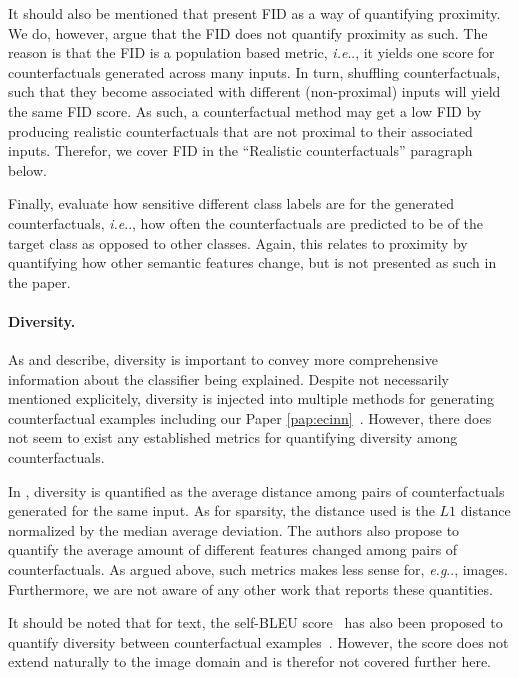 \documentclass[11pt,a4paper,twoside,openright,final]{memoir}
\makeatletter
\DeclareRobustCommand\onedot{\futurelet\@let@token\@onedot}
\def\@onedot{\ifx\@let@token.\else.\null\fi\xspace}
\def\eg{\emph{e.g}\onedot} \def\Eg{\emph{E.g}\onedot}
\def\ie{\emph{i.e}\onedot} \def\Ie{\emph{I.e}\onedot}
\newcommand*{\paperref}[1]{Paper \hyperref[#1]{\ref{#1}}}
\makeatother
\begin{document}
It should also be mentioned that \cite{Rodriguez2021} present FID as a way of quantifying proximity.
We do, however, argue that the FID does not quantify proximity as such.
The reason is that the FID is a population based metric, \ie, it yields one score for counterfactuals generated across many inputs.
In turn, shuffling counterfactuals, such that they become associated with different (non-proximal) inputs will yield the same FID score.
As such, a counterfactual method may get a low FID by producing realistic counterfactuals that are not proximal to their associated inputs.
Therefor, we cover FID in the ``Realistic counterfactuals'' paragraph below. 

Finally, \citet{Singla2019} evaluate how sensitive different class labels are for the generated counterfactuals, \ie, how often the counterfactuals are predicted to be of the target class as opposed to other classes.
Again, this relates to proximity by quantifying how other semantic features change, but is not presented as such in the paper. 

\paragraph{Diversity.}
As \citet{Mothilal2020} and \citet{Wachter2017} describe, diversity is important to convey more comprehensive information about the classifier being explained.
Despite not necessarily mentioned explicitely, diversity is injected into multiple methods for generating counterfactual examples including our \paperref{pap:ecinn}~\cite{Joshi2018, Singla2019, Rodriguez2021}. 
However, there does not seem to exist any established metrics for quantifying diversity among counterfactuals.

In \cite{Mothilal2020}, diversity is quantified as the average distance among pairs of counterfactuals generated for the same input. 
As for sparsity, the distance used is the $L1$ distance normalized by the median average deviation.
The authors also propose to quantify the average amount of different features changed among pairs of counterfactuals.
As argued above, such metrics makes less sense for, \eg, images.
Furthermore, we are not aware of any other work that reports these quantities.

It should be noted that for text, the self-BLEU score~\cite{self-bleu} has also been proposed to quantify diversity between counterfactual examples~\cite{Wu2021}.
However, the score does not extend naturally to the image domain and is therefor not covered further here.
\end{document}

